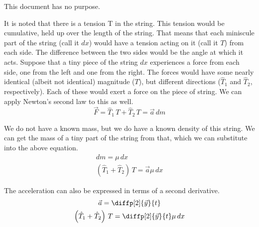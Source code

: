 \documentclass{article}
\begin{document}
    This document has no purpose.

    It is noted that there is a tension T in the string.
    This tension would be cumulative, held up over the length of the string.
    That means that each miniscule part of the string (call it $dx$) would have a tension acting on it (call it $T$) from each side.
    The difference between the two sides would be the angle at which it acts.
    Suppose that a tiny piece of the string $dx$ experiences a force from each side, one from the left and one from the right.
    The forces would have some nearly identical (albeit not identical) magnitude ($T$), but different directions ($\hat{T}_1$ and $\hat{T}_2$, respectively).
    Each of these would exert a force on the piece of string.
    We can apply Newton's second law to this as well.
    \begin{equation}
        \vec{F} = \hat{T}_1\,T + \hat{T}_2\,T = \vec{a}\,dm
    \end{equation}

    We do not have a known mass, but we do have a known density of this string.
    We can get the mass of a tiny part of the string from that, which we can substitute into the above equation.
    \begin{gather}
        dm  =   \mu\,dx\\
        \left( \hat{T}_1 + \hat{T}_2 \right)\,T = \vec{a}\mu\,dx
    \end{gather}

    The acceleration can also be expressed in terms of a second derivative.
    \begin{gather}
        \vec{a} = \diffp[2]{\vec{y}}{t}\\
        \left( \hat{T}_1 + \hat{T}_2 \right)\,T = \diffp[2]{\vec{y}}{t}\mu\,dx
    \end{gather}
\end{document}
